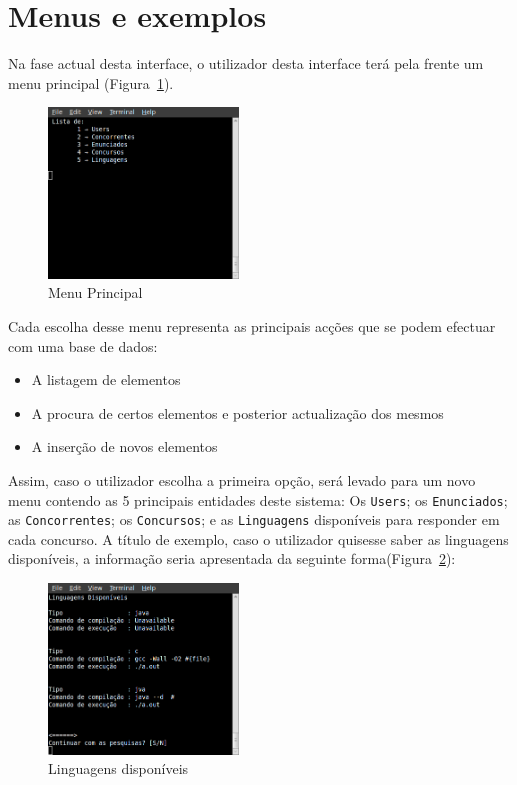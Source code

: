 \section{Menus e exemplos}

Na fase actual desta interface, o utilizador desta interface terá pela frente um menu principal (Figura~\ref{img:menuprinc}). \\

\begin{figure}[H]
\begin{center}
\includegraphics[width=0.45\textwidth]{Images/menuPrinc}
\caption{Menu Principal}\label{img:menuprinc}
\end{center}
\end{figure} 

Cada escolha desse menu representa as principais acções que se podem efectuar com uma base de dados: 

\begin{itemize}
 \item A listagem de elementos
 \item A procura de certos elementos e posterior actualização dos mesmos
 \item A inserção de novos elementos
\end{itemize}

Assim, caso o utilizador escolha a primeira opção, será levado para um novo menu contendo as 5 principais entidades deste sistema: Os \texttt{Users}; os \texttt{Enunciados}; as \texttt{Concorrentes}; os \texttt{Concursos}; e as \texttt{Linguagens} disponíveis para responder em cada concurso. A título de exemplo, caso o utilizador quisesse saber 
as linguagens disponíveis, a informação seria apresentada da seguinte forma(Figura~\ref{img:linguagens}):\\

\begin{figure}[H]
\begin{center}
\includegraphics[width=0.45\textwidth]{Images/linguagens}
\caption{Linguagens disponíveis}\label{img:linguagens}
\end{center}
\end{figure} 

